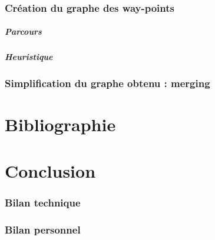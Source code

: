 \documentclass[a4paper,12pt]{report}
\begin{document}
\subsection{Création du graphe des way-points}

\paragraph{Parcours}

\paragraph{Heuristique}


\subsection{Simplification du graphe obtenu : merging}

\chapter{Bibliographie}

\chapter{Conclusion}

\subsection*{Bilan technique}

\subsection*{Bilan personnel}
\end{document}
